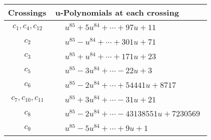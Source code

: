 \documentclass[1p]{elsarticle_modified}
\theoremstyle{definition}
\begin{document}
\begin{tabular}{m{50pt}|m{274pt}}
Crossings & \hspace{64pt}u-Polynomials at each crossing \\
\hline $$\begin{aligned}c_{1},c_{4},c_{12}\end{aligned}$$&$\begin{aligned}
&u^{85}+5 u^{84}+\cdots+97 u+11
\end{aligned}$\\
\hline $$\begin{aligned}c_{2}\end{aligned}$$&$\begin{aligned}
&u^{85}- u^{84}+\cdots+301 u+71
\end{aligned}$\\
\hline $$\begin{aligned}c_{3}\end{aligned}$$&$\begin{aligned}
&u^{85}+u^{84}+\cdots+171 u+23
\end{aligned}$\\
\hline $$\begin{aligned}c_{5}\end{aligned}$$&$\begin{aligned}
&u^{85}-3 u^{84}+\cdots-22 u+3
\end{aligned}$\\
\hline $$\begin{aligned}c_{6}\end{aligned}$$&$\begin{aligned}
&u^{85}-2 u^{84}+\cdots+54441 u+8717
\end{aligned}$\\
\hline $$\begin{aligned}c_{7},c_{10},c_{11}\end{aligned}$$&$\begin{aligned}
&u^{85}+3 u^{84}+\cdots-31 u+21
\end{aligned}$\\
\hline $$\begin{aligned}c_{8}\end{aligned}$$&$\begin{aligned}
&u^{85}-2 u^{84}+\cdots-43138551 u+7230569
\end{aligned}$\\
\hline $$\begin{aligned}c_{9}\end{aligned}$$&$\begin{aligned}
&u^{85}-5 u^{84}+\cdots+9 u+1
\end{aligned}$\\
\hline
\end{tabular}\\~\\
\end{document}
